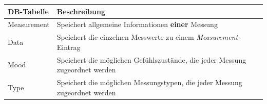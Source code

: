 \begin{table}[h]
	\centering
		\begin{tabularx}{\textwidth}{l|X}
			\hline
			DB-Tabelle & Beschreibung \\
			\hline
			\hline
			Measurement & Speichert allgemeine Informationen \textbf{einer} Messung\\
			\hline
			Data & Speichert die einzelnen Messwerte zu einem \textit{Measurement}-Eintrag\\
			\hline
			Mood & Speichert die möglichen Gefühlszustände, die jeder Messung zugeordnet werden\\
			\hline
			Type & Speichert die möglichen Messungstypen, die jeder Messung zugeordnet werden\\
			\hline
		\end{tabularx}
\end{table}
